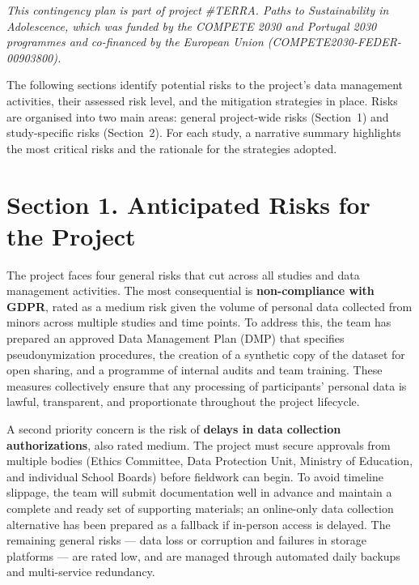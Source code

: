 \vspace{0.5cm}

\noindent\textit{This contingency plan is part of project \#TERRA. Paths to Sustainability in Adolescence, which was funded by the COMPETE 2030 and Portugal 2030 programmes and co-financed by the European Union (COMPETE2030-FEDER-00903800).}

\vspace{0.8cm}

\noindent The following sections identify potential risks to the project's data management activities, their assessed risk level, and the mitigation strategies in place. Risks are organised into two main areas: general project-wide risks (Section~1) and study-specific risks (Section~2). For each study, a narrative summary highlights the most critical risks and the rationale for the strategies adopted.

\section*{Section 1. Anticipated Risks for the Project}

The project faces four general risks that cut across all studies and data management activities. The most consequential is \textbf{non-compliance with GDPR}, rated as a medium risk given the volume of personal data collected from minors across multiple studies and time points. To address this, the team has prepared an approved Data Management Plan (DMP) that specifies pseudonymization procedures, the creation of a synthetic copy of the dataset for open sharing, and a programme of internal audits and team training. These measures collectively ensure that any processing of participants' personal data is lawful, transparent, and proportionate throughout the project lifecycle.

A second priority concern is the risk of \textbf{delays in data collection authorizations}, also rated medium. The project must secure approvals from multiple bodies (Ethics Committee, Data Protection Unit, Ministry of Education, and individual School Boards) before fieldwork can begin. To avoid timeline slippage, the team will submit documentation well in advance and maintain a complete and ready set of supporting materials; an online-only data collection alternative has been prepared as a fallback if in-person access is delayed. The remaining general risks --- data loss or corruption and failures in storage platforms --- are rated low, and are managed through automated daily backups and multi-service redundancy.

